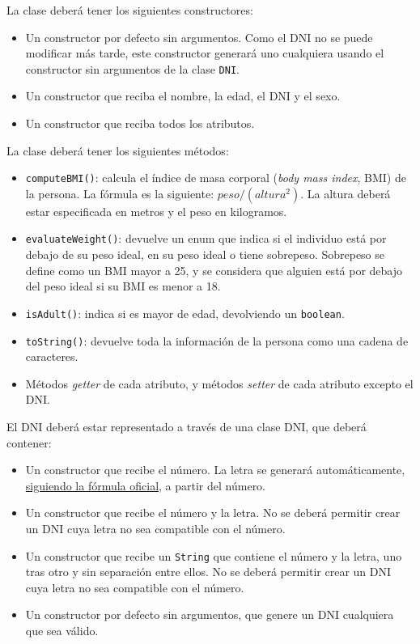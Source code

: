 \documentclass[a4paper]{article}
\newcommand{\code}[1]{\texttt{#1}}
\begin{document}
\begin{enumerate}
    La clase deberá tener los siguientes constructores:
    
    \begin{itemize}
        \item Un constructor por defecto sin argumentos. Como el DNI no se puede modificar más tarde, este constructor generará uno cualquiera usando el constructor sin argumentos de la clase \code{DNI}.
        \item Un constructor que reciba el nombre, la edad, el DNI y el sexo.
        \item Un constructor que reciba todos los atributos.
    \end{itemize}

    La clase deberá tener los siguientes métodos:

    \begin{itemize}
        \item \code{computeBMI()}: calcula el índice de masa corporal (\textit{body mass index}, BMI) de la persona. La fórmula es la siguiente: $peso / (altura^2)$. La altura deberá estar especificada en metros y el peso en kilogramos.
        \item \code{evaluateWeight()}: devuelve un enum que indica si el individuo está por debajo de su peso ideal, en su peso ideal o tiene sobrepeso. Sobrepeso se define como  un BMI mayor a 25, y se considera que alguien está por debajo del peso ideal si su BMI es menor a 18.
        \item \code{isAdult()}: indica si es mayor de edad, devolviendo un \code{boolean}.
        \item \code{toString()}: devuelve toda la información de la persona como una cadena de caracteres.
        \item Métodos \textit{getter} de cada atributo, y métodos \textit{setter} de cada atributo excepto el DNI.
    \end{itemize}

    El DNI deberá estar representado a través de una clase DNI, que deberá contener:

    \begin{itemize}
        \item Un constructor que recibe el número. La letra se generará automáticamente, \href{https://www.letranif.com/}{siguiendo la fórmula oficial}, a partir del número.
        \item Un constructor que recibe el número y la letra. No se deberá permitir crear un DNI cuya letra no sea compatible con el número.
        \item Un constructor que recibe un \code{String} que contiene el número y la letra, uno tras otro y sin separación entre ellos. No se deberá permitir crear un DNI cuya letra no sea compatible con el número.
        \item Un constructor por defecto sin argumentos, que genere un DNI cualquiera que sea válido.
    \end{itemize}


\end{enumerate}
\end{document}
